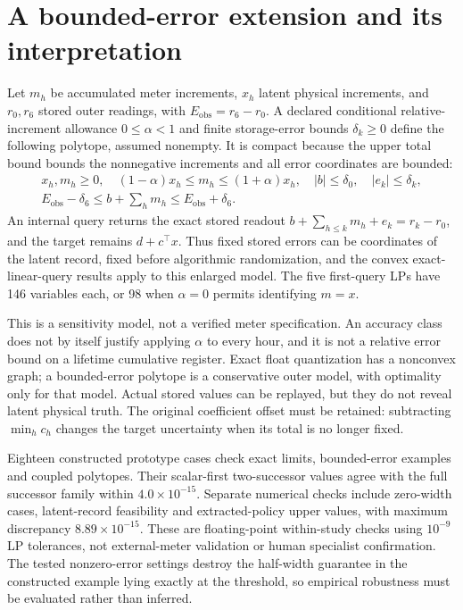 \section{A bounded-error extension and its interpretation}\label{app:stored-error}
Let $m_h$ be accumulated meter increments, $x_h$ latent physical increments,
and $r_0,r_6$ stored outer readings, with $E_{\mathrm{obs}}=r_6-r_0$.
A declared conditional relative-increment allowance $0\leq\alpha<1$ and
finite storage-error bounds $\delta_k\geq0$ define the following
polytope, assumed nonempty. It is compact because the upper total bound
bounds the nonnegative increments and all error coordinates are bounded:
\[
\begin{gathered}
 x_h,m_h\geq0,\quad(1-\alpha)x_h\leq m_h\leq(1+\alpha)x_h,\quad
 |b|\leq\delta_0,\quad |e_k|\leq\delta_k,\\
 E_{\mathrm{obs}}-\delta_6\leq b+\sum_hm_h\leq E_{\mathrm{obs}}+\delta_6.
\end{gathered}
\]
An internal query returns the exact stored readout
$b+\sum_{h\leq k}m_h+e_k=r_k-r_0$, and the target remains $d+c^\top x$.
Thus fixed stored errors can be coordinates of the latent record, fixed
before algorithmic randomization, and the convex exact-linear-query
results apply to this enlarged model. The five first-query LPs have
146 variables each, or 98 when $\alpha=0$ permits identifying $m=x$.

This is a sensitivity model, not a verified meter specification.
An accuracy class does not by itself justify applying $\alpha$ to every
hour, and it is not a relative error bound on a lifetime cumulative register.
Exact float quantization has a nonconvex graph; a bounded-error polytope
is a conservative outer model, with optimality only for that model.
Actual stored values can be replayed, but they do not reveal latent
physical truth. The original coefficient offset must be retained:
subtracting $\min_hc_h$ changes the target uncertainty when its total
is no longer fixed.

Eighteen constructed prototype cases check exact limits, bounded-error
examples and coupled polytopes. Their scalar-first two-successor values
agree with the full successor family within $4.0\times10^{-15}$.
Separate numerical checks include zero-width cases, latent-record feasibility
and extracted-policy upper values, with maximum discrepancy
$8.89\times10^{-15}$. These are floating-point within-study checks using
$10^{-9}$ LP tolerances, not external-meter validation or human specialist
confirmation. The tested nonzero-error settings destroy the half-width guarantee in the
constructed example lying exactly at the threshold, so empirical
robustness must be evaluated rather than inferred.
